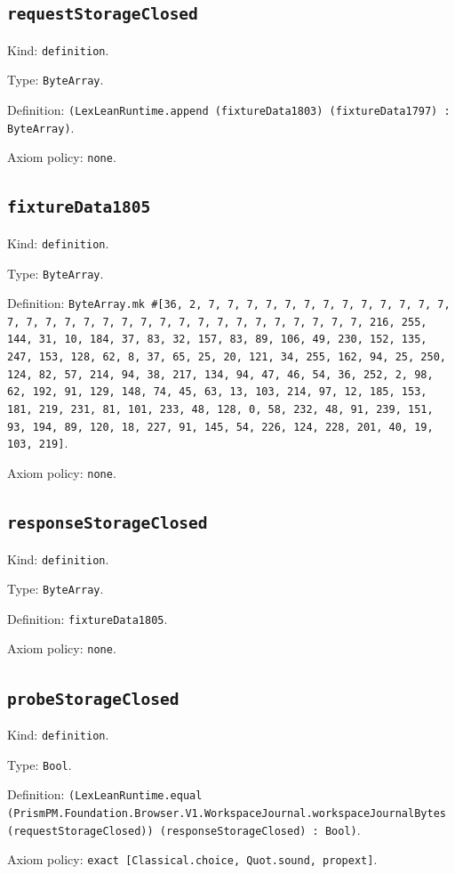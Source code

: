 \documentclass[11pt]{article}
\begin{document}
\subsection*{\texttt{requestStorageClosed}}
\noindent Kind: \texttt{definition}.\par
\noindent Type: \texttt{ByteArray}.\par
\noindent Definition: \texttt{(LexLeanRuntime.append (fixtureData1803) (fixtureData1797) : ByteArray)}.\par
\noindent Axiom policy: \texttt{none}.\par
\subsection*{\texttt{fixtureData1805}}
\noindent Kind: \texttt{definition}.\par
\noindent Type: \texttt{ByteArray}.\par
\noindent Definition: \texttt{ByteArray.mk \#[36, 2, 7, 7, 7, 7, 7, 7, 7, 7, 7, 7, 7, 7, 7, 7, 7, 7, 7, 7, 7, 7, 7, 7, 7, 7, 7, 7, 7, 7, 7, 7, 7, 7, 216, 255, 144, 31, 10, 184, 37, 83, 32, 157, 83, 89, 106, 49, 230, 152, 135, 247, 153, 128, 62, 8, 37, 65, 25, 20, 121, 34, 255, 162, 94, 25, 250, 124, 82, 57, 214, 94, 38, 217, 134, 94, 47, 46, 54, 36, 252, 2, 98, 62, 192, 91, 129, 148, 74, 45, 63, 13, 103, 214, 97, 12, 185, 153, 181, 219, 231, 81, 101, 233, 48, 128, 0, 58, 232, 48, 91, 239, 151, 93, 194, 89, 120, 18, 227, 91, 145, 54, 226, 124, 228, 201, 40, 19, 103, 219]}.\par
\noindent Axiom policy: \texttt{none}.\par
\subsection*{\texttt{responseStorageClosed}}
\noindent Kind: \texttt{definition}.\par
\noindent Type: \texttt{ByteArray}.\par
\noindent Definition: \texttt{fixtureData1805}.\par
\noindent Axiom policy: \texttt{none}.\par
\subsection*{\texttt{probeStorageClosed}}
\noindent Kind: \texttt{definition}.\par
\noindent Type: \texttt{Bool}.\par
\noindent Definition: \texttt{(LexLeanRuntime.equal (PrismPM.Foundation.Browser.V1.WorkspaceJournal.workspaceJournalBytes (requestStorageClosed)) (responseStorageClosed) : Bool)}.\par
\noindent Axiom policy: \texttt{exact [Classical.choice, Quot.sound, propext]}.\par
\end{document}
